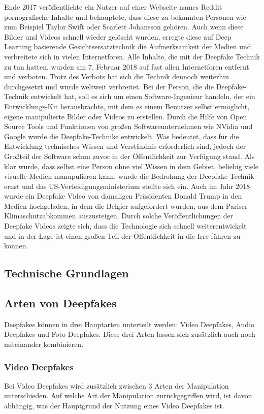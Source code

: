 Ende 2017 veröffentlichte ein Nutzer auf einer Webseite names Reddit pornografische Inhalte und behauptete, dass diese zu bekannten Personen wie zum Beispiel Taylor Swift oder Scarlett Johansson gehören.
Auch wenn diese Bilder und Videos schnell wieder gelöscht wurden, erregte diese auf Deep Learning basierende Gesichtsersatztechnik die Aufmerksamkeit der Medien und verbreitete sich in vielen Internetforen.
Alle Inhalte, die mit der Deepfake Technik zu tun hatten, wurden am 7. Februar 2018 auf fast allen Internetforen entfernt und verboten.
Trotz des Verbots hat sich die Technik dennoch weiterhin durchgesetzt und wurde weltweit verbreitet.
Bei der Person, die die Deepfake-Technik entwickelt hat, soll es sich um einen Software-Ingenieur handeln, der ein Entwicklungs-Kit herausbrachte, mit dem es einem Benutzer selbst ermöglicht, eigene manipulierte Bilder oder Videos zu erstellen.
Durch die Hilfe von Open Source Tools und Funktionen von großen Softwareunternehmen wie NVidia und Google wurde die Deepfake-Technike entwickelt. Was bedeutet, dass für die Entwicklung technisches Wissen und Verständnis erforderlich sind, jedoch der Großteil der Software schon zuvor in der Öffentlichkeit zur Verfügung stand.
Als klar wurde, dass selbst eine Person ohne viel Wissen in dem Gebiet, beliebig viele visuelle Medien manupulieren kann, wurde die Bedrohung der Deepfake-Technik ernst und das US-Verteidigungsministerium stellte sich ein.
Auch im Jahr 2018 wurde ein Deepfake Video von damaligen Präsidenten Donald Trump in den Medien hochgeladen, in dem die Belgier aufgefordert wurden, aus dem Pariser Klimaschutzabkommen auszusteigen.\newline
Durch solche Veröffentlichungen der Deepfake Videos zeigte sich, dass die Technologie sich schnell weiterentwickelt und in der Lage ist einen großen Teil der Öffentlichkeit in die Irre führen zu können.\cite{Jatit}

\subsection{Technische Grundlagen}
\subsection{Arten von Deepfakes}
Deepfakes können in drei Hauptarten unterteilt werden: Video Deepfakes, Audio Deepfakes und Foto Deepfakes. Diese drei Arten lassen sich zusätzlich auch noch miteinander kombinieren.\cite{ResearchGate}\newline
\subsubsection{Video Deepfakes}
Bei Video Deepfakes wird zusätzlich zwischen 3 Arten der Manipulation unterschieden. Auf welche Art der Manipulation zurückgegriffen wird, ist davon abhängig, was der Hauptgrund der Nutzung eines Video Deepfakes ist.\cite{ResearchGate}

